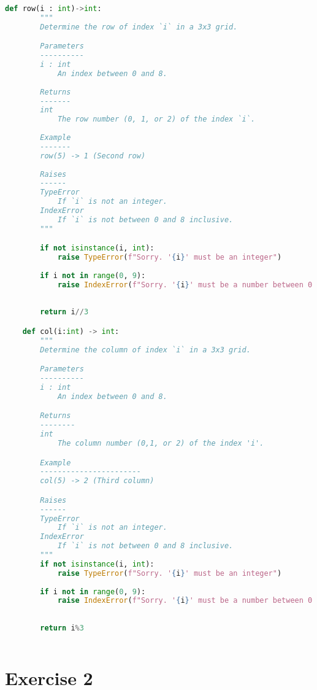 \documentclass[12pt]{article}
\theoremstyle{definition}
\begin{document}
\begin{lstlisting}[language=Python, caption=Exercise 1]
    def row(i : int)->int:
        """ 
        Determine the row of index `i` in a 3x3 grid. 

        Parameters 
        ---------- 
        i : int 
            An index between 0 and 8. 
            
        Returns 
        ------- 
        int 
            The row number (0, 1, or 2) of the index `i`. 
        
        Example 
        ------- 
        row(5) -> 1 (Second row) 
        
        Raises 
        ------ 
        TypeError 
            If `i` is not an integer. 
        IndexError 
            If `i` is not between 0 and 8 inclusive. 
        """

        if not isinstance(i, int):
            raise TypeError(f"Sorry. '{i}' must be an integer")
        
        if i not in range(0, 9):
            raise IndexError(f"Sorry. '{i}' must be a number between 0 and 8 inclusive.")
        
        
        return i//3

    def col(i:int) -> int:
        """
        Determine the column of index `i` in a 3x3 grid. 

        Parameters
        ----------
        i : int
            An index between 0 and 8. 

        Returns
        --------
        int
            The column number (0,1, or 2) of the index 'i'.

        Example 
        -----------------------
        col(5) -> 2 (Third column)

        Raises 
        ------ 
        TypeError 
            If `i` is not an integer. 
        IndexError 
            If `i` is not between 0 and 8 inclusive.
        """
        if not isinstance(i, int):
            raise TypeError(f"Sorry. '{i}' must be an integer")
        
        if i not in range(0, 9):
            raise IndexError(f"Sorry. '{i}' must be a number between 0 and 8 inclusive.")
        
        
        return i%3
        
\end{lstlisting}
    



\section*{Exercise 2}
\end{document}
